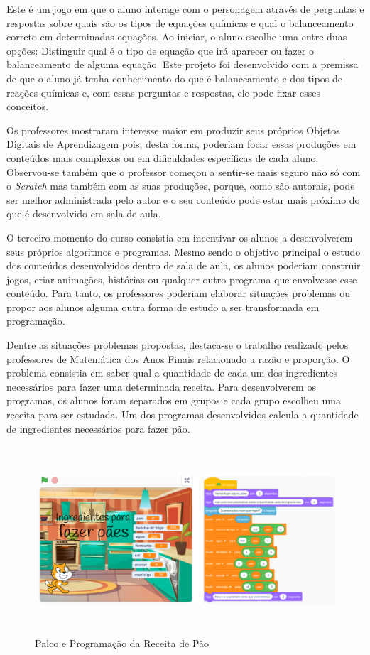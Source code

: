 \documentclass[12pt, openright, a4paper, brazil, english, french, spanish, bibjustif, openany, oneside]{abntex2}
\begin{document}
Este é um jogo em que o aluno interage com o personagem através de perguntas e respostas sobre quais são os tipos de equações químicas e qual o balanceamento correto em determinadas equações. Ao iniciar, o aluno escolhe uma entre duas opções: Distinguir qual é o tipo de equação que irá aparecer ou fazer o balanceamento de alguma equação. Este projeto foi desenvolvido com a premissa de que o aluno já tenha conhecimento do que é balanceamento e dos tipos de reações químicas e, com essas perguntas e respostas, ele pode fixar esses conceitos.

Os professores mostraram interesse maior em produzir seus próprios Objetos Digitais de Aprendizagem pois, desta forma, poderiam focar essas produções em conteúdos mais complexos ou em dificuldades específicas de cada aluno. Observou-se também que o professor começou a sentir-se mais seguro não só com o \textit{Scratch} mas também com as suas produções, porque, como são autorais, pode ser melhor administrada pelo autor e o seu conteúdo pode estar mais próximo do que é desenvolvido em sala de aula.

O terceiro momento do curso consistia em incentivar os alunos a desenvolverem seus próprios algoritmos e programas. Mesmo sendo o objetivo principal o estudo dos conteúdos desenvolvidos dentro de sala de aula, os alunos poderiam construir jogos, criar animações, histórias ou qualquer outro programa que envolvesse esse conteúdo. Para tanto, os professores poderiam elaborar situações problemas ou propor aos alunos alguma outra forma de estudo a ser transformada em programação.

Dentre as situações problemas propostas, destaca-se o trabalho realizado pelos professores de Matemática dos Anos Finais relacionado a razão e proporção. O problema consistia em saber qual a quantidade de cada um dos ingredientes necessários para fazer uma determinada receita. Para desenvolverem os programas, os alunos foram separados em grupos e cada grupo escolheu uma receita para ser estudada. Um dos programas desenvolvidos calcula a quantidade de ingredientes necessários para fazer pão.

\begin{figure}[H]

 \centering
 
         \caption{Palco e Programação da Receita de Pão \label{pao}}
         \includegraphics[height=7cm]{recpao.png}
       
    
\end{figure}
\end{document}
